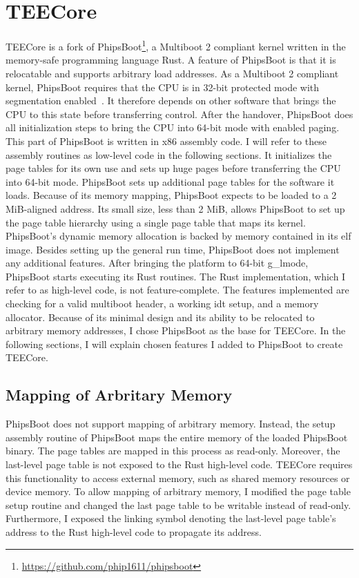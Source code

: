 \section{TEECore}
\label{sec:implementation:teeKernel}
TEECore is a fork of
PhipsBoot\footnote{\url{https://github.com/phip1611/phipsboot}}, a Multiboot 2
compliant kernel written in the memory-safe programming language Rust. A feature
of PhipsBoot is that it is relocatable and supports arbitrary load addresses. As
a Multiboot 2 compliant kernel, PhipsBoot requires that the CPU is in 32-bit
protected mode with segmentation enabled~\cite{mb2}. It therefore depends on
other software that brings the CPU to this state before transferring control.
After the handover, PhipsBoot does all initialization steps to bring the CPU
into 64-bit mode with enabled paging. This part of PhipsBoot is written in x86
assembly code. I will refer to these assembly routines as low-level code in the
following sections. It initializes the page tables for its own use and sets up
huge pages before transferring the CPU into 64-bit mode. PhipsBoot sets up
additional page tables for the software it loads. Because of its memory mapping,
PhipsBoot expects to be loaded to a 2 MiB-aligned address. Its small size, less
than 2 MiB, allows PhipsBoot to set up the page table hierarchy using a single
page table that maps its kernel. PhipsBoot's dynamic memory allocation is backed
by memory contained in its \gls{elf} image. Besides setting up the general run
time, PhipsBoot does not implement any additional features. After bringing the
platform to 64-bit \gls{g_lmode}, PhipsBoot starts executing its Rust routines.
The Rust implementation, which I refer to as high-level code, is not
feature-complete. The features implemented are checking for a valid multiboot
header, a working \gls{idt} setup, and a memory allocator. Because of its
minimal design and its ability to be relocated to arbitrary memory addresses, I
chose PhipsBoot as the base for TEECore. In the following sections, I will
explain chosen features I added to PhipsBoot to create TEECore.\\

\subsection{Mapping of Arbritary Memory}
\label{sec:implementation:teeKernel:mem}
PhipsBoot does not support mapping of arbitrary memory. Instead, the setup
assembly routine of PhipsBoot maps the entire memory of the loaded PhipsBoot
binary. The page tables are mapped in this process as read-only. Moreover, the
last-level page table is not exposed to the Rust high-level code. TEECore
requires this functionality to access external memory, such as shared memory
resources or device memory. To allow mapping of arbitrary memory, I modified the
page table setup routine and changed the last page table to be writable instead
of read-only. Furthermore, I exposed the linking symbol denoting the last-level
page table's address to the Rust high-level code to propagate its address.\\

